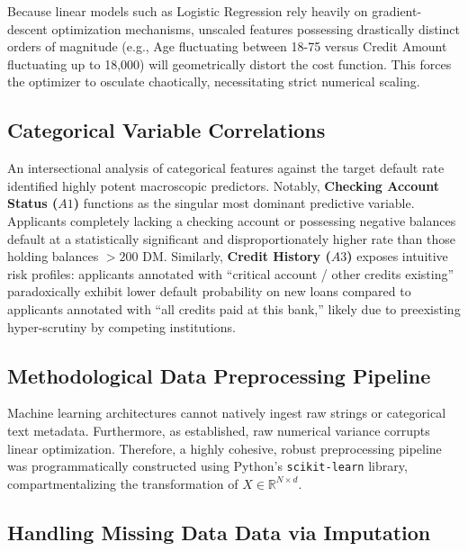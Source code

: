 Because linear models such as Logistic Regression rely heavily on
gradient-descent optimization mechanisms, unscaled features possessing
drastically distinct orders of magnitude (e.g., Age fluctuating between
18-75 versus Credit Amount fluctuating up to 18,000) will geometrically
distort the cost function. This forces the optimizer to osculate
chaotically, necessitating strict numerical scaling.

\hypertarget{categorical-variable-correlations}{%
\subsection{Categorical Variable
Correlations}\label{categorical-variable-correlations}}

An intersectional analysis of categorical features against the target
default rate identified highly potent macroscopic predictors. Notably,
\textbf{Checking Account Status (\(A1\))} functions as the singular most
dominant predictive variable. Applicants completely lacking a checking
account or possessing negative balances default at a statistically
significant and disproportionately higher rate than those holding
balances \(> 200\) DM. Similarly, \textbf{Credit History (\(A3\))}
exposes intuitive risk profiles: applicants annotated with ``critical
account / other credits existing'' paradoxically exhibit lower default
probability on new loans compared to applicants annotated with ``all
credits paid at this bank,'' likely due to preexisting hyper-scrutiny by
competing institutions.

\hypertarget{methodological-data-preprocessing-pipeline}{%
\subsection{Methodological Data Preprocessing
Pipeline}\label{methodological-data-preprocessing-pipeline}}

Machine learning architectures cannot natively ingest raw strings or
categorical text metadata. Furthermore, as established, raw numerical
variance corrupts linear optimization. Therefore, a highly cohesive,
robust preprocessing pipeline was programmatically constructed using
Python's \texttt{scikit-learn} library, compartmentalizing the
transformation of \(X \in \mathbb{R}^{N \times d}\).

\hypertarget{handling-missing-data-data-via-imputation}{%
\subsection{Handling Missing Data Data via
Imputation}\label{handling-missing-data-data-via-imputation}}

